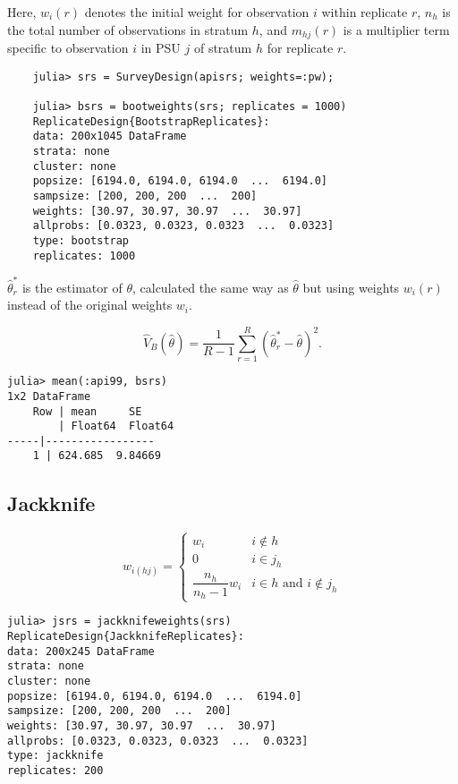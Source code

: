 \documentclass{juliacon}
\begin{document}
Here, $w_i(r)$ denotes the initial weight for observation $i$ within replicate $r$, $n_h$ is the total number of observations in stratum $h$, and $m_{hj}(r)$ is a multiplier term specific to observation $i$ in PSU $j$ of stratum $h$ for replicate $r$.

\begin{lstlisting}
    julia> srs = SurveyDesign(apisrs; weights=:pw);
    
    julia> bsrs = bootweights(srs; replicates = 1000)
    ReplicateDesign{BootstrapReplicates}:
    data: 200x1045 DataFrame
    strata: none
    cluster: none
    popsize: [6194.0, 6194.0, 6194.0  ...  6194.0]
    sampsize: [200, 200, 200  ...  200]
    weights: [30.97, 30.97, 30.97  ...  30.97]
    allprobs: [0.0323, 0.0323, 0.0323  ...  0.0323]
    type: bootstrap
    replicates: 1000
\end{lstlisting}

$\hat{\theta}^*_r$ is the estimator of $\theta$, calculated the same way as $\hat{\theta}$ but using weights $w_i(r)$ instead of the original weights $w_i$. 

\begin{equation}
        \hat{V}_B(\hat{\theta}) = \dfrac{1}{R-1}\sum_{r=1}^{R} (\hat{\theta}^*_r - \hat{\theta})^2.
\end{equation}

\begin{lstlisting}
julia> mean(:api99, bsrs)
1x2 DataFrame
    Row | mean     SE      
        | Float64  Float64 
-----|-----------------
    1 | 624.685  9.84669
\end{lstlisting}

\subsection{Jackknife}

\begin{equation}
    w_{i(hj)} = \begin{cases}
        w_i & i \notin h\\
    0 & i \in j_{h} \\
    \dfrac{n_h}{n_h - 1} w_i &  i \in h \text{ and } i \notin j_{h}
    \end{cases} %
    \end{equation} \cite{jackknifeLohr}


\begin{lstlisting}
julia> jsrs = jackknifeweights(srs)
ReplicateDesign{JackknifeReplicates}:
data: 200x245 DataFrame
strata: none
cluster: none
popsize: [6194.0, 6194.0, 6194.0  ...  6194.0]
sampsize: [200, 200, 200  ...  200]
weights: [30.97, 30.97, 30.97  ...  30.97]
allprobs: [0.0323, 0.0323, 0.0323  ...  0.0323]
type: jackknife
replicates: 200
\end{lstlisting}
\end{document}
